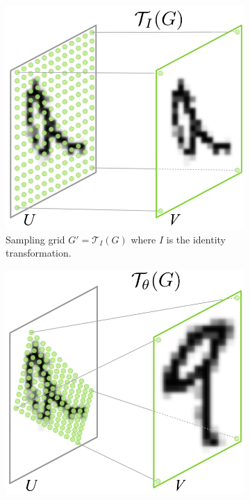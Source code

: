 \begin{figure}[!htbp]
    \centering
    \begin{subfigure}[b]{.39\textwidth}
        \centering
        \includegraphics[width=\textwidth]{figures/neural_networks/space_transformer_ti.png}
        \caption{Sampling grid \(G' = \mathcal{T}_I(G)\) where \(I\) is the identity transformation.}\label{subfig:spacetransformer_ti}
    \end{subfigure}
    \hspace{35pt}
    \begin{subfigure}[b]{.39\textwidth}
        \includegraphics[width=\textwidth]{figures/neural_networks/space_transformer_ttheta.png}

\end{subfigure}
\end{figure}

